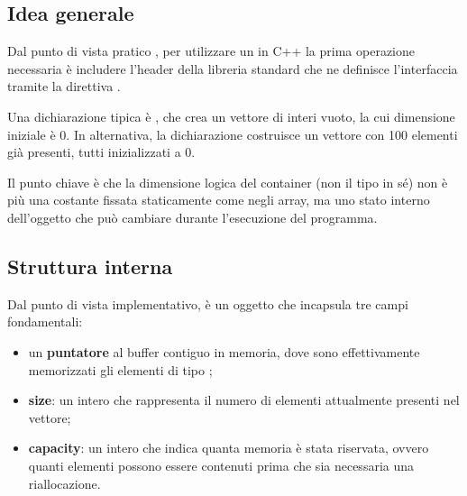 \subsection{Idea generale}
 Dal punto di vista pratico , per utilizzare un  in C++ la prima operazione necessaria è includere l'header della libreria standard che ne definisce l'interfaccia tramite la direttiva .  




Una dichiarazione tipica è
, che crea un vettore di interi vuoto,
la cui dimensione iniziale è 0.
In alternativa, la dichiarazione
costruisce un vettore con 100 elementi già presenti,
tutti inizializzati a 0.

Il punto chiave è che la dimensione logica del container
(non il tipo  in sé)
non è più una costante fissata staticamente come negli array,
ma uno stato interno dell'oggetto che può cambiare
durante l'esecuzione del programma.

\subsection{Struttura interna}

Dal punto di vista implementativo,  è un oggetto
che incapsula tre campi fondamentali:

\begin{itemize}
    \item un \textbf{puntatore} al buffer contiguo in memoria, dove sono
          effettivamente memorizzati gli elementi di tipo ;
    \item \textbf{size}: un intero che rappresenta il numero di elementi
          attualmente presenti nel vettore;
    \item \textbf{capacity}: un intero che indica quanta memoria è stata
          riservata, ovvero quanti elementi possono essere contenuti prima
          che sia necessaria una riallocazione.
\end{itemize}

